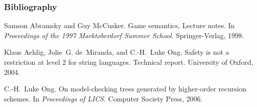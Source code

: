 \begin{frame} \frametitle<presentation>{Bibliography}

  \beamertemplatearticlebibitems
    Samson Abramsky and Guy McCusker.
    \newblock Game semantics, Lecture notes.
    \newblock In {\em Proceedings of the 1997 Marktoberdorf Summer School}. Springer-Verlag, 1998.

    Klaus Aehlig, Jolie~G. de~Miranda, and C.-H.~Luke Ong.
    \newblock Safety is not a restriction at level 2 for string languages.
    \newblock Technical report. University of Oxford, 2004.

    C.-H.~Luke Ong.
    \newblock On model-checking trees generated by higher-order recursion schemes.
    \newblock In {\em Proceedings of LICS.} Computer Society Press, 2006.


\end{frame}


